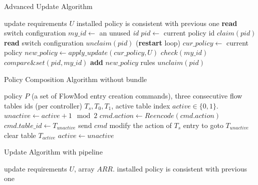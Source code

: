 \documentclass[conference]{sigcomm-alternate}
\begin{document}
\begin{algorithm}[t]
    \caption{Advanced Update Algorithm}
    \label{alg:update}
    \begin{algorithmic}[1]
    \Require update requirements $U$
    \Ensure installed policy is consistent with previous one
 		\Repeat
 			\State \textbf{read} switch configuration
 			\State $my\_id\gets$ an unused \emph{id} 
 			\State $pid\gets$ current policy id 
 			\State $claim(pid)$
 			\State \textbf{read} switch configuration
	 			\State $unclaim(pid)$
 				 (\textbf{restart} loop)
 			\EndIf
 			\State $cur\_policy\gets$ current policy
 			\State $new\_policy\gets apply\_update(cur\_policy,U)$
 			\startBundle
 				\State $check(my\_id)$
	 			\State $compare\&set(pid,my\_id)$
	 			\State \textbf{add} $new\_policy$ rules %
 			\endBundle
	 		\State $unclaim(pid)$
			\Return

    \end{algorithmic}
\end{algorithm}


\begin{algorithm}[t]
    \caption{Policy Composition Algorithm without bundle}
    \label{alg:template}
    \begin{algorithmic}[1]
    \Require policy $P$ (a set of FlowMod entry creation commands), three consecutive flow tables ids (per controller) $T_s,T_0,T_1$, active table index $active\in\{0,1\}$.
    \State $unactive \gets active + 1 \mod{2}$
	    \State $cmd.action\gets Reencode(cmd.action)$
	    \State $cmd.table\_id\gets T_{unactive}$
	    \State send $cmd$
    \EndFor
    \State modify the action of $T_s$ entry to goto $T_{unactive}$
    \State clear table $T_{active}$
    \State $active \gets unactive$
	\Return

    \end{algorithmic}
\end{algorithm}

\begin{algorithm}[t]
    \caption{Update Algorithm with pipeline}
    \label{alg:template}
    \begin{algorithmic}[1]
    \Require update requirements $U$, array $ARR$.
    \Ensure installed policy is consistent with previous one
			\Return

    \end{algorithmic}
\end{algorithm}
\end{document}
